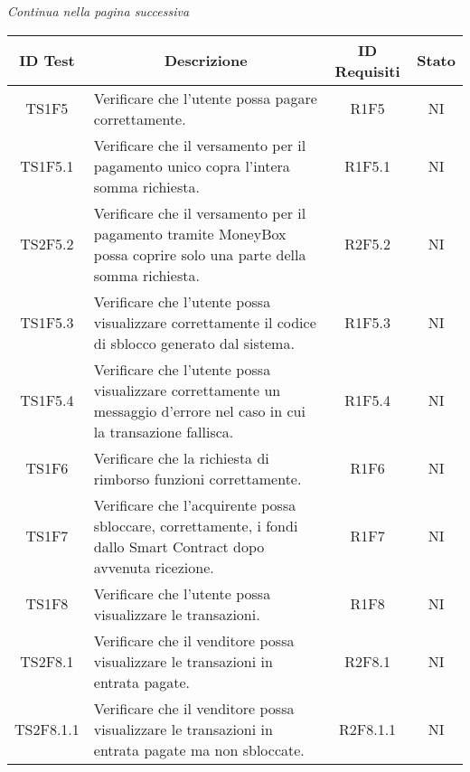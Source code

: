 \begin{center}
  \textit{\small Continua nella pagina successiva}
\end{center}
\begin{table}[H]
  \centering
  \renewcommand{\arraystretch}{1.8}
  \begin{tabular}{c|p{8cm}|c|c}
    \rowcolor[HTML]{125E28}
    \color[HTML]{FFFFFF}\textbf{ID Test}
              & \multicolumn{1}{c}{\color[HTML]{FFFFFF}\textbf{Descrizione}}
              & \color[HTML]{FFFFFF}\textbf{ID Requisiti}
              & \color[HTML]{FFFFFF}\textbf{Stato}                                                                                                 \\
    \hline
    TS1F5     & Verificare che l'utente possa pagare correttamente.                                                                       & R1F5     & NI \\
    TS1F5.1   & Verificare che il versamento per il pagamento unico copra l'intera somma richiesta.                                       & R1F5.1   & NI \\
    TS2F5.2   & Verificare che il versamento per il pagamento tramite MoneyBox\glo{} possa coprire solo una parte della somma richiesta.  & R2F5.2   & NI \\
    TS1F5.3   & Verificare che l'utente possa visualizzare correttamente il codice di sblocco generato dal sistema.                       & R1F5.3   & NI \\
    TS1F5.4   & Verificare che l'utente possa visualizzare correttamente un messaggio d'errore nel caso in cui la transazione fallisca.   & R1F5.4   & NI \\
    TS1F6     & Verificare che la richiesta di rimborso funzioni correttamente.                                                           & R1F6     & NI \\
    TS1F7     & Verificare che l'acquirente possa sbloccare, correttamente, i fondi dallo Smart Contract\glo{} dopo avvenuta ricezione.   & R1F7     & NI \\
    TS1F8     & Verificare che l'utente possa visualizzare le transazioni.                                                                & R1F8     & NI \\
    TS2F8.1   & Verificare che il venditore possa visualizzare le transazioni in entrata pagate.                                          & R2F8.1   & NI \\
    TS2F8.1.1 & Verificare che il venditore possa visualizzare le transazioni in entrata pagate ma non sbloccate.                         & R2F8.1.1 & NI \\

\end{tabular}
\end{table}
